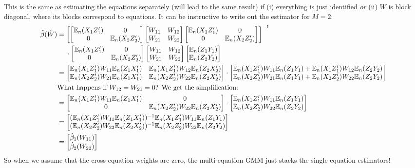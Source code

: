 \documentclass[10pt]{article}
\begin{document}
\begin{remark}
	This is the same as estimating the equations separately (\ie will lead to the same result) if (i) everything is just identified \emph{or} (ii) $W$ is block diagonal, where its blocks correspond to equations. It can be instructive to write out the estimator for $M = 2$:
	\begin{align*}
		\hat{\beta}(\hat{W}) &= \left[ \begin{bmatrix}\mathbb{E}_n(X_1Z_1') & 0 \\ 0 & \mathbb{E}_n(X_2Z_2')\end{bmatrix}\begin{bmatrix}W_{11} & W_{12} \\ W_{21} & W_{22}\end{bmatrix} \begin{bmatrix}\mathbb{E}_n(X_1Z_1') & 0 \\ 0 & \mathbb{E}_n(X_2Z_2')\end{bmatrix}\right]^{-1} \\
		&\;\quad \cdot \begin{bmatrix}\mathbb{E}_n(X_1Z_1') & 0 \\ 0 & \mathbb{E}_n(X_2Z_2')\end{bmatrix}\begin{bmatrix}W_{11} & W_{12} \\ W_{21} & W_{22}\end{bmatrix} \begin{bmatrix}\mathbb{E}_n(Z_1Y_1) \\ \mathbb{E}_n(Z_2Y_2)\end{bmatrix} \\
		&= \begin{bmatrix}\mathbb{E}_n(X_1Z_1') W_{11} \mathbb{E}_n(Z_1X_1') & \mathbb{E}_n(X_1Z_1') W_{12} \mathbb{E}_n(Z_2X_2') \\\mathbb{E}_n(X_2Z_2') W_{21} \mathbb{E}_n(Z_1X_1') & \mathbb{E}_n(X_2Z_2') W_{22} \mathbb{E}_n(Z_2X_2')\end{bmatrix} \cdot \begin{bmatrix}\mathbb{E}_n(X_1Z_1') W_{11} \mathbb{E}_n(Z_1Y_1) + \mathbb{E}_n(X_1Z_1') W_{12} \mathbb{E}_n(Z_2Y_2) \\ \mathbb{E}_n(X_2Z_2') W_{21} \mathbb{E}_n(Z_1Y_1) + \mathbb{E}_n(X_2Z_2') W_{22} \mathbb{E}_n(Z_2Y_2)\end{bmatrix} \\
		&\text{What happens if $W_{12} = W_{21} = 0$? We get the simplification:} \\
		&= \begin{bmatrix}\mathbb{E}_n(X_1Z_1') W_{11} \mathbb{E}_n(Z_1X_1') & 0 \\0& \mathbb{E}_n(X_2Z_2') W_{22} \mathbb{E}_n(Z_2X_2')\end{bmatrix} \cdot \begin{bmatrix}\mathbb{E}_n(X_1Z_1') W_{11} \mathbb{E}_n(Z_1Y_1)  \\  \mathbb{E}_n(X_2Z_2') W_{22} \mathbb{E}_n(Z_2Y_2)\end{bmatrix} \\
		&= \begin{bmatrix}(\mathbb{E}_n(X_1Z_1') W_{11} \mathbb{E}_n(Z_1X_1'))^{-1}\mathbb{E}_n(X_1Z_1') W_{11} \mathbb{E}_n(Z_1Y_1) \\ (\mathbb{E}_n(X_2Z_2') W_{22} \mathbb{E}_n(Z_2X_2'))^{-1}\mathbb{E}_n(X_2Z_2') W_{22} \mathbb{E}_n(Z_2Y_2)\end{bmatrix} \\
		&= \begin{bmatrix}\hat{\beta}_1(W_{11}) \\ \hat{\beta}_2(W_{22})\end{bmatrix}
	\end{align*}
	So when we assume that the cross-equation weights are zero, the multi-equation GMM just stacks the single equation estimators!
\end{remark}
\end{document}
